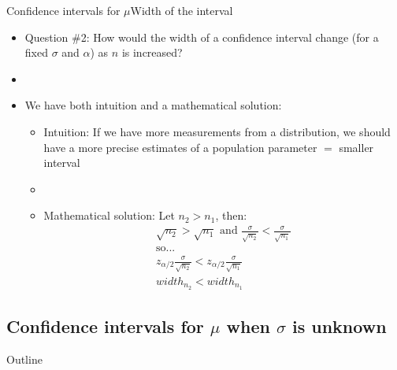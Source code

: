 \documentclass[xcolor=dvipsnames]{beamer}
\begin{document}
\begin{frame}{Confidence intervals for $\mu$}{Width of the interval}
	\begin{itemize}
		\item Question \#2: How would the width of a confidence interval change (for a fixed $\sigma$ and $\alpha$) as $n$ is increased?  \pause
		\item[]
		\item We have both intuition and a mathematical solution:
		\begin{itemize}
			\item Intuition: If we have more measurements from a distribution, we should have a more precise estimates of a population parameter $=$ smaller interval  \pause
			\item[]
			\item Mathematical solution: Let $n_2 > n_1$, then:
			\begin{gather*}
				\sqrt{n_2} > \sqrt{n_1} \text{ and } \frac{\sigma}{\sqrt{n_2}} < \frac{\sigma}{\sqrt{n_1}} \\
				\text{so...} \\
				z_{\alpha / 2} \frac{\sigma}{\sqrt{n_2}} < z_{\alpha / 2} \frac{\sigma}{\sqrt{n_1}} \\
				width_{n_2} < width_{n_1}
			\end{gather*}
		\end{itemize}
	\end{itemize}
\end{frame}

\subsection{Confidence intervals for $\mu$ when $\sigma$ is unknown}

\begin{frame}{Outline}
	\tableofcontents[currentsection,subsectionstyle=show/shaded/hide]
\end{frame}
\end{document}

